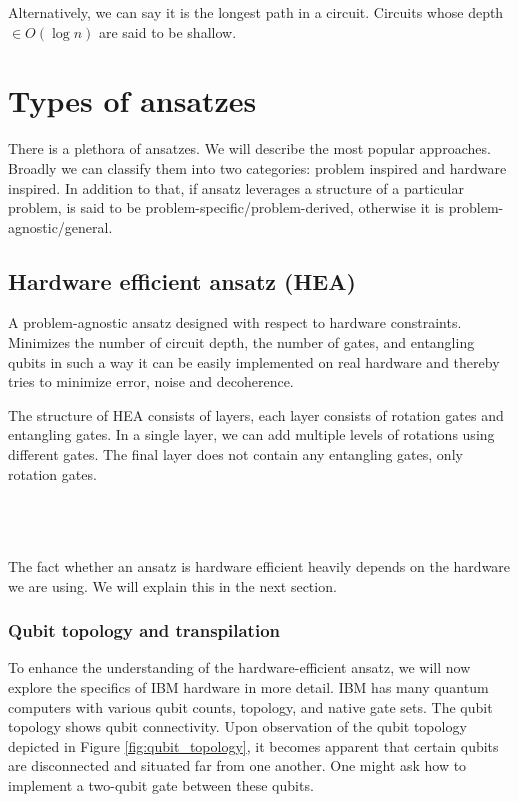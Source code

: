 Alternatively, we can say it is the longest path in a circuit. Circuits whose depth $\in O(\log n)$ are said to be shallow.

\section{Types of ansatzes}
There is a plethora of ansatzes. We will describe the most popular approaches. Broadly we can classify them into two categories: problem inspired and hardware inspired. In addition to that, if ansatz leverages a structure of a particular problem, is said to be problem-specific/problem-derived, otherwise it is problem-agnostic/general. 

\subsection{Hardware efficient ansatz (HEA)}
A problem-agnostic ansatz designed with respect to hardware constraints. Minimizes the number of circuit depth, the number of gates, and entangling qubits in such a way it can be easily implemented on real hardware and thereby tries to minimize error, noise and decoherence.

The structure of HEA consists of layers, each layer consists of rotation gates and entangling gates. In a single layer, we can add multiple levels of rotations using different gates. The final layer does not contain any entangling gates, only rotation gates.

\\
\\
\\

The fact whether an ansatz is hardware efficient heavily depends on the hardware we are using. We will explain this in the next section.

\subsubsection{Qubit topology and transpilation}
To enhance the understanding of the hardware-efficient ansatz, we will now explore the specifics of IBM hardware in more detail. IBM has many quantum computers with various qubit counts, topology, and native gate sets. The qubit topology shows qubit connectivity. Upon observation of the qubit topology depicted in Figure \ref{fig:qubit_topology}, it becomes apparent that certain qubits are disconnected and situated far from one another. One might ask how to implement a two-qubit gate between these qubits.

